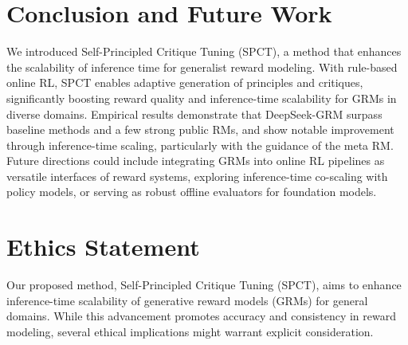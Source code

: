 \documentclass{article} %
\newcommand{\SGRMAll}{DeepSeek-GRM\xspace}
\begin{document}
\vspace{-0.5em}
\section{Conclusion and Future Work}

We introduced Self-Principled Critique Tuning (SPCT), a method that enhances the scalability of inference time for generalist reward modeling. With rule-based online RL, SPCT enables adaptive generation of principles and critiques, significantly boosting reward quality and inference-time scalability for GRMs in diverse domains. Empirical results demonstrate that \SGRMAll surpass baseline methods and a few strong public RMs, and show notable improvement through inference-time scaling, particularly with the guidance of the meta RM. 
Future directions could include integrating GRMs into online RL pipelines as versatile interfaces of reward systems, exploring inference-time co-scaling with policy models, or serving as robust offline evaluators for foundation models.




\section*{Ethics Statement}

Our proposed method, Self-Principled Critique Tuning (SPCT), aims to enhance inference-time scalability of generative reward models (GRMs) for general domains. While this advancement promotes accuracy and consistency in reward modeling, several ethical implications might warrant explicit consideration. 
\end{document}
